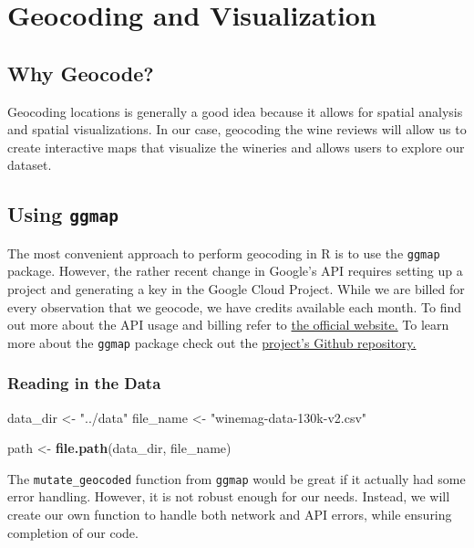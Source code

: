\documentclass[12pt,twoside]{amherstthesis}
\newenvironment{Shaded}{\begin{snugshade}}{\end{snugshade}}
\newcommand{\KeywordTok}[1]{\textcolor[rgb]{0.13,0.29,0.53}{\textbf{#1}}}
\newcommand{\DataTypeTok}[1]{\textcolor[rgb]{0.13,0.29,0.53}{#1}}
\newcommand{\DecValTok}[1]{\textcolor[rgb]{0.00,0.00,0.81}{#1}}
\newcommand{\StringTok}[1]{\textcolor[rgb]{0.31,0.60,0.02}{#1}}
\newcommand{\OperatorTok}[1]{\textcolor[rgb]{0.81,0.36,0.00}{\textbf{#1}}}
\newcommand{\NormalTok}[1]{#1}
\begin{document}
\chapter{Geocoding and Visualization}\label{geocoding-and-visualization}

\section{Why Geocode?}\label{why-geocode}

Geocoding locations is generally a good idea because it allows for
spatial analysis and spatial visualizations. In our case, geocoding the
wine reviews will allow us to create interactive maps that visualize the
wineries and allows users to explore our dataset.

\section{\texorpdfstring{Using
\texttt{ggmap}}{Using ggmap}}\label{using-ggmap}

The most convenient approach to perform geocoding in R is to use the
\texttt{ggmap} package. However, the rather recent change in Google's
API requires setting up a project and generating a key in the Google
Cloud Project. While we are billed for every observation that we
geocode, we have credits available each month. To find out more about
the API usage and billing refer to
\href{https://developers.google.com/maps/documentation/geocoding/usage-and-billing}{the
official website.} To learn more about the \texttt{ggmap} package check
out the \href{https://github.com/dkahle/ggmap}{project's Github
repository.}

\subsection{Reading in the Data}\label{reading-in-the-data}
\begin{Shaded}
\begin{Highlighting}[]
\NormalTok{data_dir <-}\StringTok{ "../data"}
\NormalTok{file_name <-}\StringTok{ "winemag-data-130k-v2.csv"}

\NormalTok{path <-}\StringTok{ }\KeywordTok{file.path}\NormalTok{(data_dir, file_name)}
\end{Highlighting}
\end{Shaded}
\begin{Shaded}
\end{Shaded}
The \texttt{mutate\_geocoded} function from \texttt{ggmap} would be
great if it actually had some error handling. However, it is not robust
enough for our needs. Instead, we will create our own function to handle
both network and API errors, while ensuring completion of our code.
\end{document}
